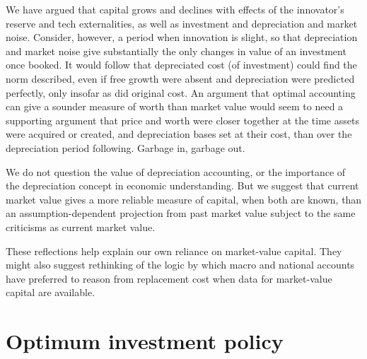 \documentclass[a4padisinvitingper,fleqn]{latex_styles/cas-sc}
\begin{document}
We have argued that capital grows and declines with effects of the innovator's reserve and tech externalities, as well as investment and depreciation and market noise. Consider, however, a period when innovation is slight, so that depreciation and market noise give substantially the only changes in value of an investment once booked. It would follow that depreciated cost (of investment)
could find the norm described, even if free growth were absent and depreciation were predicted perfectly, only insofar as did original cost. An argument that optimal accounting can give a sounder measure of worth than market value would seem  to need a supporting argument that price and worth were closer together at the time assets were acquired or created, and depreciation bases set at their cost, than over the depreciation period following. Garbage in, garbage out.

We do not question the value of depreciation accounting, or the importance of the depreciation concept in economic understanding. But we suggest that current market value gives a more reliable measure of capital, when both are known, than an assumption-dependent projection from past market value subject to the same criticisms as current market value.

These reflections help explain our own reliance on market-value capital. They might also suggest rethinking of the logic by which macro and national accounts have preferred to reason from replacement cost when data for market-value capital are available.

\hypertarget{optimum-investment-policy}{%
\section{Optimum investment policy}\label{optimum-investment-policy}}
\end{document}
